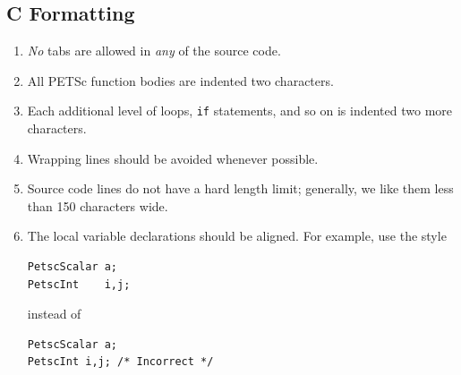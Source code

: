 \subsection{C Formatting}
\begin{enumerate}
\item {\em No} tabs are allowed in {\em any} of the source code.
\item All PETSc function bodies are indented two characters.
\item Each additional level of loops, \lstinline{if} statements, and so on is indented
      two more characters.
\item Wrapping lines should be avoided whenever possible.
\item Source code lines do not have a hard length limit; generally, we like them less than 150 characters wide.
\item The local variable declarations should be aligned. For example,
      use the style
\begin{lstlisting}
PetscScalar a;
PetscInt    i,j;
\end{lstlisting}
instead of
\begin{lstlisting}
PetscScalar a;
PetscInt i,j; /* Incorrect */
\end{lstlisting}


\end{enumerate}
